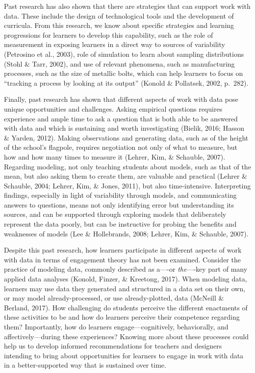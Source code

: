 \documentclass[]{msu-thesis}
\theoremstyle{definition}
\theoremstyle{definition}
\theoremstyle{definition}
\theoremstyle{remark}
\begin{document}
Past research has also shown that there are strategies that can support
work with data. These include the design of technological tools and the
development of curricula. From this research, we know about specific
strategies and learning progressions for learners to develop this
capability, such as the role of measurement in exposing learners in a
direct way to sources of variability (Petrosino et al., 2003), role of
simulation to learn about sampling distributions (Stohl \& Tarr, 2002),
and use of relevant phenomena, such as manufacturing processes, such as
the size of metallic bolts, which can help learners to focus on
``tracking a process by looking at its output'' (Konold \& Pollatsek,
2002, p.~282).

Finally, past research has shown that different aspects of work with
data pose unique opportunities and challenges. Asking empirical
questions requires experience and ample time to ask a question that is
both able to be answered with data and which is sustaining and worth
investigating (Bielik, 2016; Hasson \& Yarden, 2012). Making
observations and generating data, such as of the height of the school's
flagpole, requires negotiation not only of what to measure, but how and
how many times to measure it (Lehrer, Kim, \& Schauble, 2007). Regarding
modeling, not only teaching students about models, such as that of the
mean, but also asking them to create them, are valuable and practical
(Lehrer \& Schauble, 2004; Lehrer, Kim, \& Jones, 2011), but also
time-intensive. Interpreting findings, especially in light of
variability through models, and communicating answers to questions,
means not only identifying error but understanding its sources, and can
be supported through exploring models that deliberately represent the
data poorly, but can be instructive for probing the benefits and
weaknesses of models (Lee \& Hollebrands, 2008; Lehrer, Kim, \&
Schauble, 2007).

Despite this past research, how learners participate in different
aspects of work with data in terms of engagement theory has not been
examined. Consider the practice of modeling data, commonly described as
a----or \emph{the}----key part of many applied data analyses (Konold,
Finzer, \& Kreetong, 2017). When modeling data, learners may use data
they generated and structured in a data set on their own, or may model
already-processed, or use already-plotted, data (McNeill \& Berland,
2017). How challenging do students perceive the different enactments of
these activities to be and how do learners perceive their competence
regarding them? Importantly, how do learners engage---cognitively,
behaviorally, and affectively---during these experiences? Knowing more
about these processes could help us to develop informed recommendations
for teachers and designers intending to bring about opportunities for
learners to engage in work with data in a better-supported way that is
sustained over time.
\end{document}
